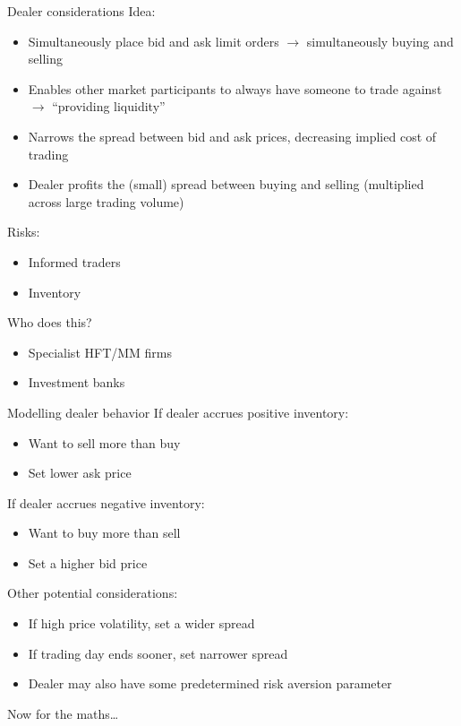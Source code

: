 \documentclass{beamer} %
\begin{document}
\begin{frame}{Dealer considerations}
    Idea:
    \begin{itemize}
        \item Simultaneously place bid and ask limit orders $\rightarrow$ simultaneously buying and selling
        \item Enables other market participants to always have someone to trade against $\rightarrow$ ``providing liquidity''
        \item Narrows the spread between bid and ask prices, decreasing implied cost of trading
        \item Dealer profits the (small) spread between buying and selling (multiplied across large trading volume)
    \end{itemize}
    Risks:
    \begin{itemize}
        \item Informed traders
        \item Inventory
    \end{itemize}
    Who does this?
    \begin{itemize}
        \item Specialist HFT/MM firms
        \item Investment banks
    \end{itemize}
\end{frame}

\begin{frame}{Modelling dealer behavior}
    If dealer accrues positive inventory:
    \begin{itemize}
        \item Want to sell more than buy
        \item Set lower ask price
    \end{itemize}
    If dealer accrues negative inventory:
    \begin{itemize}
        \item Want to buy more than sell
        \item Set a higher bid price
    \end{itemize}
    Other potential considerations:
    \begin{itemize}
        \item If high price volatility, set a wider spread 
        \item If trading day ends sooner, set narrower spread
        \item Dealer may also have some predetermined risk aversion parameter
    \end{itemize}
    Now for the maths\dots
\end{frame}
\end{document}
